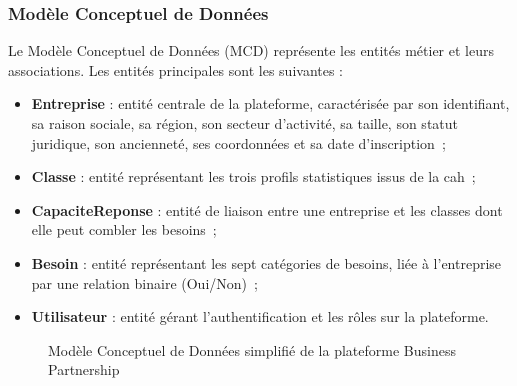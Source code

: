\documentclass[12pt, a4paper, oneside]{report}
\begin{document}
\subsubsection{Modèle Conceptuel de Données}

Le Modèle Conceptuel de Données (MCD) représente les entités métier et leurs associations. Les entités principales sont les suivantes :

\begin{itemize}
  \item \textbf{Entreprise} : entité centrale de la plateforme, caractérisée par son identifiant, sa raison sociale, sa région, son secteur d'activité, sa taille, son statut juridique, son ancienneté, ses coordonnées et sa date d'inscription~;
  \item \textbf{Classe} : entité représentant les trois profils statistiques issus de la \gls{cah}~;
  \item \textbf{CapaciteReponse} : entité de liaison entre une entreprise et les classes dont elle peut combler les besoins~;
  \item \textbf{Besoin} : entité représentant les sept catégories de besoins, liée à l'entreprise par une relation binaire (Oui/Non)~;
  \item \textbf{Utilisateur} : entité gérant l'authentification et les rôles sur la plateforme.
\end{itemize}

\begin{figure}[H]
  \centering
  \caption{Modèle Conceptuel de Données simplifié de la plateforme Business Partnership}
  \label{fig:mcd}
\end{figure}
\end{document}
